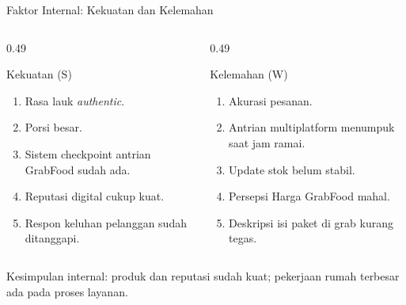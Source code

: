 \documentclass[aspectratio=169,11pt]{beamer}
\begin{document}
\begin{frame}{Faktor Internal: Kekuatan dan Kelemahan}
\small
\begin{columns}[T,onlytextwidth]
    \begin{column}{0.49\textwidth}
        \begin{block}{Kekuatan (S)}
        \begin{enumerate}
            \item Rasa lauk \textit{authentic}.
            \item Porsi besar.
            \item Sistem checkpoint antrian GrabFood sudah ada.
            \item Reputasi digital cukup kuat.
            \item Respon keluhan pelanggan sudah ditanggapi.
        \end{enumerate}
        \end{block}
    \end{column}
    \begin{column}{0.49\textwidth}
        \begin{block}{Kelemahan (W)}
        \begin{enumerate}
            \item Akurasi pesanan.
            \item Antrian multiplatform menumpuk saat jam ramai.
            \item Update stok belum stabil.
            \item Persepsi Harga GrabFood mahal.
            \item Deskripsi isi paket di grab kurang tegas.
        \end{enumerate}
        \end{block}
    \end{column}
\end{columns}
\vspace{0.15cm}
\alert{Kesimpulan internal:} produk dan reputasi sudah kuat; pekerjaan rumah terbesar ada pada proses layanan.
\end{frame}
\end{document}
